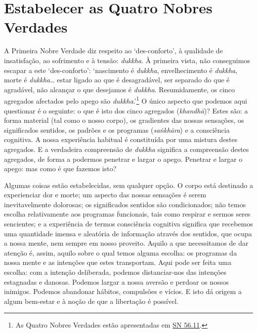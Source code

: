 \section{Estabelecer as Quatro Nobres Verdades}

A Primeira Nobre Verdade diz respeito ao `des-conforto', à qualidade de insatisfação, ao sofrimento e à tensão: \emph{dukkha}. À primeira vista, não conseguimos escapar a este `des-conforto': `nascimento é \emph{dukkha}, envelhecimento é \emph{dukkha}, morte é \emph{dukkha}\ldots{} estar ligado ao que é desagradável, ser separado do que é agradável, não alcançar o que desejamos é \emph{dukkha}. Resumidamente, os cinco agregados afectados pelo apego são \emph{dukkha}.'\footnote{As Quatro Nobres Verdades estão apresentadas em \href{https://suttacentral.net/sn56.11/en/bodhi}{SN 56.11}.} O único aspecto que podemos aqui questionar é o seguinte: o que é isto dos cinco agregados (\emph{khandhā})? Estes são: a forma material (tal como o nosso corpo), os gradientes das nossas sensações, os significados sentidos, os padrões e os programas (\emph{saṅkhāra}) e a consciência cognitiva. A nossa experiência habitual é constituída por uma mistura destes agregados. E a verdadeira compreensão de \emph{dukkha} significa a compreensão destes agregados, de forma a podermos penetrar e largar o apego. Penetrar e largar o apego: mas como é que fazemos isto?

Algumas coisas estão estabelecidas, sem qualquer opção. O corpo está destinado a experienciar dor e morte; um aspecto das nossas sensações é serem inevitavelmente dolorosas; os significados sentidos são condicionados; não temos escolha relativamente aos programas funcionais, tais como respirar e sermos seres sencientes; e a experiência de termos consciência cognitiva significa que recebemos uma quantidade imensa e aleatória de informação através dos sentidos, que ocupa a nossa mente, nem sempre em nosso proveito. Aquilo a que necessitamos de dar atenção é, assim, aquilo sobre o qual temos alguma escolha: os programas da nossa mente e as intenções que estes transportam. Aqui pode ser feita uma escolha: com a intenção deliberada, podemos distanciar-nos das intenções estagnadas e danosas. Podemos largar a nossa aversão e perdoar os nossos inimigos. Podemos abandonar hábitos, compulsões e vícios. E isto dá origem a algum bem-estar e à noção de que a libertação é possível.

